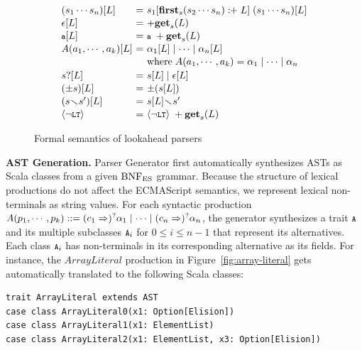 \begin{figure}[t]
\centering
\small
\[
  \begin{array}{l@{~}c@{~}l}
    (\symb_1 \cdots \symb_n)[\la] &=&
    \symb_1[\symbfirst{\symb_2 \cdots \symb_n} \firstplus \la] \;
    (\symb_1 \cdots \symb_n)[\la]\\[.1em]
    \epsilon[\la] &=& +\getlap{\la}\\[.1em]
    \T{a}[\la] &=& \T{a} \; +\getlap{\la} \\[.1em]
    \NT{A}(\argument_1, \cdots, \argument_k)[\la] &=&
    \rhs_1[\la] \mid \cdots \mid \rhs_n[\la]\\[.1em]
    && \text{where} \; \NT{A}(\argument_1, \cdots, \argument_k) =
    \rhs_1 \mid \cdots \mid \rhs_n\\[.2em]

    \symb?[\la] &=& \symb[\la] \mid \epsilon[\la]\\[.1em]
    (\pm\symb)[\la] &=& \pm(\symb[\la]) \\[.1em]
    (\symb \butnot \symb')[\la] &=& \symb[\la] \butnot \symb'\\[.1em]
    \nolt &=& \nolt \; +\getlap{\la}
  \end{array}
\]
\caption{Formal semantics of lookahead parsers}
\label{fig:laparser}
\vspace*{-1em}
\end{figure}

\smallskip

\textbf{AST Generation.}
{\sf Parser Generator} first automatically synthesizes ASTs as Scala classes
from a given \( \text{BNF}_{\text{ES}} \) grammar.  Because the structure of lexical productions do
not affect the ECMAScript semantics, we represent lexical non-terminals as
string values.  For each syntactic production \(
  A(p_1, \cdots, p_k) ::=
  (c_1 \Rightarrow)^? \alpha_1 \mid
  \cdots \mid
  (c_n \Rightarrow)^? \alpha_n
\), the generator synthesizes a trait \( \texttt{\footnotesize A} \) and its multiple
subclasses \( \texttt{\footnotesize A}_i \) for \(0 \le i \le n-1\)
that represent its alternatives.  Each class \( \texttt{\footnotesize A}_i \) has
non-terminals in its corresponding alternative as its fields.
For instance, the \( ArrayLiteral \) production in Figure~\ref{fig:array-literal}
gets automatically translated to the following Scala classes:
\begin{lstlisting}[style=smallScalastyle]
trait ArrayLiteral extends AST
case class ArrayLiteral0(x1: Option[Elision])
case class ArrayLiteral1(x1: ElementList)
case class ArrayLiteral2(x1: ElementList, x3: Option[Elision])
\end{lstlisting}

